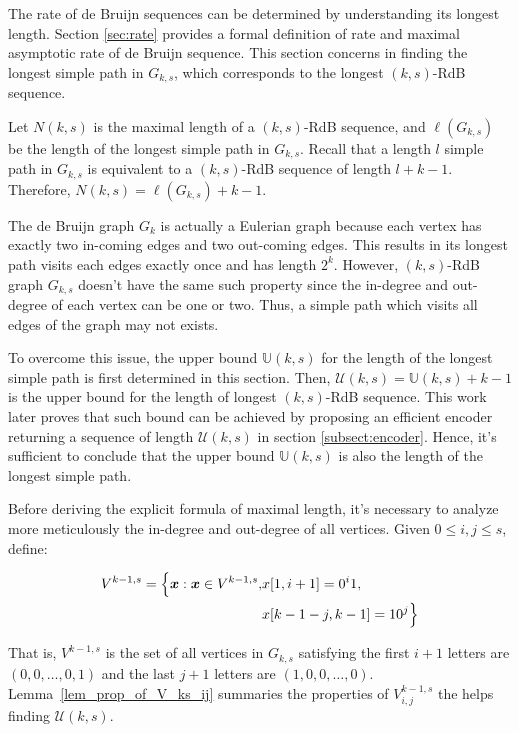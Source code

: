The rate of de Bruijn sequences can be determined by understanding its longest length. Section \ref{sec:rate} provides a formal definition of rate and maximal asymptotic rate of de Bruijn sequence. This section concerns in finding the longest simple path in $G_{k,s}$, which corresponds to the longest $(k,s)$-RdB sequence.

Let $N(k,s)$ is the maximal length of a $(k,s)$-RdB sequence, and $\ell(G_{k,s})$ be the length of the longest simple path in $G_{k,s}$. Recall that a length $l$ simple path in $G_{k,s}$ is equivalent to a $(k,s)$-RdB sequence of length $l+k-1$. Therefore, $N(k,s) = \ell(G_{k,s})+k-1$. 

The de Bruijn graph $G_{k}$ is actually a Eulerian graph because each vertex has exactly two in-coming edges and two out-coming edges. This results in its longest path visits each edges exactly once and has length $2^{k}$. However, $(k,s)$-RdB graph $G_{k,s}$ doesn't have the same such property since the in-degree and out-degree of each vertex can be one or two. Thus, a simple path which visits all edges of the graph may not exists. 

To overcome this issue, the upper bound $\mathbb{U}(k,s)$ for the length of the longest simple path is first determined in this section. Then, $\mathcal{U}(k,s)=\mathbb{U}(k,s)+k-1$ is the upper bound for the length of longest $(k,s)$-RdB sequence. This work later proves that such bound can be achieved by proposing an efficient encoder returning a sequence of length $\mathcal{U}(k,s)$ in section \ref{subsect:encoder}. Hence, it's sufficient to conclude that the upper bound $\mathbb{U}(k,s)$ is also the length of the longest simple path.

Before deriving the explicit formula of maximal length, it's necessary to analyze more meticulously the in-degree and out-degree of all vertices. Given $0\leq i,j\leq s$, define:

\begin{align*}
    V^{k-1,s} = \Bigl\{ {\boldsymbol x}: {\boldsymbol x}\in V^{k-1,s}, &x[1,i+1]=0^{i}1,  \\
    &x[k-1-j,k-1]=10^{j} \Bigl\}
\end{align*}

That is, $V^{k-1,s}$ is the set of all vertices in $G_{k,s}$ satisfying the first $i+1$ letters are $(0,0,\ldots,0,1)$ and the last $j+1$ letters are $(1,0,0,\ldots,0)$. Lemma~\ref{lem_prop_of_V_ks_ij} summaries the properties of $V^{k-1,s}_{i,j}$ the helps finding $\mathscr{U}(k,s)$.

